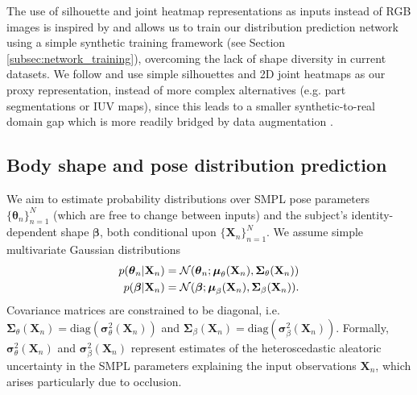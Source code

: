 \documentclass[final]{cvpr}
\begin{document}
The use of silhouette and joint heatmap representations as inputs instead of RGB images is inspired by \cite{pavlakos2018humanshape, STRAPS2020BMVC} and allows us to train our distribution prediction network using a simple synthetic training framework (see Section \ref{subsec:network_training}), overcoming the lack of shape diversity in current datasets. We follow \cite{STRAPS2020BMVC} and use simple silhouettes and 2D joint heatmaps as our proxy representation, instead of more complex alternatives (e.g. part segmentations or IUV maps), since this leads to a smaller synthetic-to-real domain gap which is more readily bridged by data augmentation \cite{STRAPS2020BMVC}.

\subsection{Body shape and pose distribution prediction}

We aim to estimate probability distributions \cite{nix1994icnn} over SMPL pose parameters $\{\boldsymbol{\theta}_n\}_{n=1}^N$ (which are free to change between inputs) and the subject's identity-dependent shape $\boldsymbol{\beta}$, both conditional upon $\{\mathbf{X}_n\}_{n=1}^N$. We assume simple multivariate Gaussian distributions
\begin{equation}
\begin{aligned}
p(\boldsymbol{\theta}_n | {\mathbf{X}_n}) & = \mathcal{N}(\boldsymbol{\theta}_n ; \boldsymbol{\mu}_\theta({\mathbf{X}_n}), \boldsymbol{\Sigma}_\theta ({\mathbf{X}_n}))\\
p(\boldsymbol{\beta} | {\mathbf{X}_n}) & = \mathcal{N}(\boldsymbol{\beta} ; \boldsymbol{\mu}_\beta({\mathbf{X}_n}), \boldsymbol{\Sigma}_\beta ({\mathbf{X}_n})).
\end{aligned}
\label{eqn:pose_shape_distributions}
\vspace{-0.1cm}
\end{equation}
Covariance matrices are constrained to be diagonal, i.e. $\boldsymbol{\Sigma}_\theta (\mathbf{X}_n) = \text{diag}(\boldsymbol{\sigma}^2_\theta (\mathbf{X}_n))$ and $\boldsymbol{\Sigma}_\beta (\mathbf{X}_n) = \text{diag}(\boldsymbol{\sigma}^2_\beta(\mathbf{X}_n))$. Formally, $\boldsymbol{\sigma}^2_\theta(\mathbf{X}_n)$ and $\boldsymbol{\sigma}^2_\beta(\mathbf{X}_n)$ represent estimates of the heteroscedastic aleatoric uncertainty \cite{derkiureghian2009aleatoric_epistemic, kendall2017whatuncertainties} in the SMPL parameters explaining the input observations $\mathbf{X}_n$, which arises particularly due to occlusion.
\end{document}
